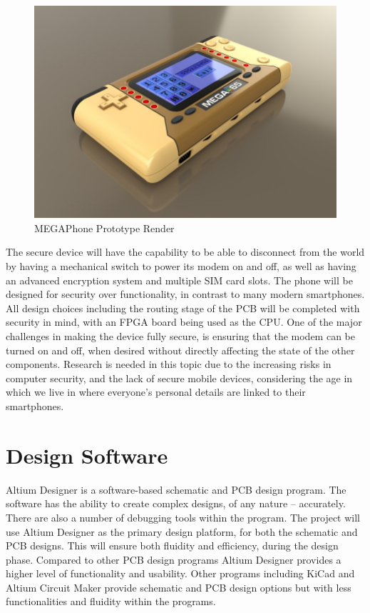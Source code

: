 \begin{figure}
	\includegraphics[width=\linewidth]{render.jpg}
	\caption{MEGAPhone Prototype Render}
	\label{fig:render}
\end{figure}

	The secure device will have the capability to be able to disconnect from the world by having a mechanical switch to power its modem on and off, as well as having an advanced encryption system and multiple SIM card slots. The phone will be designed for security over functionality, in contrast to many modern smartphones. All design choices including the routing stage of the PCB will be completed with security in mind, with an FPGA board being used as the CPU.
	One of the major challenges in making the device fully secure, is ensuring that the modem can be turned on and off, when desired without directly affecting the state of the other components. 
	Research is needed in this topic due to the increasing risks in computer security, and the lack of secure mobile devices, considering the age in which we live in where everyone’s personal details are linked to their smartphones.


\section{Design Software}

	Altium Designer is a software-based schematic and PCB design program. The software has the ability to create complex designs, of any nature – accurately. There are also a number of debugging tools within the program. 
The project will use Altium Designer as the primary design platform, for both the schematic and PCB designs. This will ensure both fluidity and efficiency, during the design phase. 
Compared to other PCB design programs Altium Designer provides a higher level of functionality and usability. Other programs including KiCad and Altium Circuit Maker provide schematic and PCB design options but with less functionalities and fluidity within the programs. 
